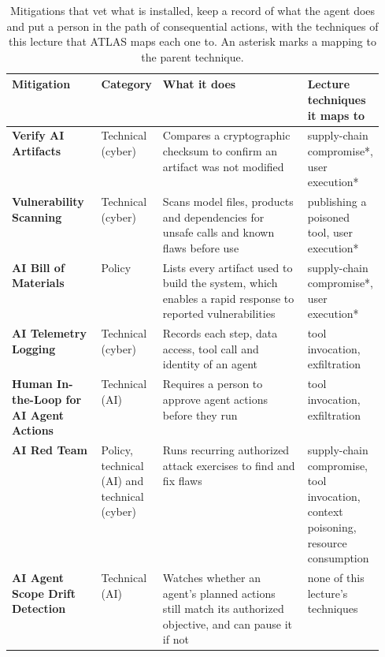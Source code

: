 \begin{table}[tb]
  \caption{Mitigations that vet what is installed, keep a record of what the agent does and put a
  person in the path of consequential actions, with the techniques of this lecture that ATLAS maps
  each one to. An asterisk marks a mapping to the parent technique.}
  \label{tab:mitigations-oversight}
  \begin{adjustbox}{width=\linewidth}\begin{tabularx}{\linewidth}{L{0.24\linewidth}L{0.11\linewidth}XL{0.2\linewidth}}
    \toprule
    \textbf{Mitigation} & \textbf{Category} & \textbf{What it does} & \textbf{Lecture techniques it maps to} \\
    \midrule
    \textbf{Verify AI Artifacts} & Technical (cyber) & Compares a cryptographic checksum to confirm
    an artifact was not modified & supply-chain compromise*, user execution* \\
    \textbf{Vulnerability Scanning} & Technical (cyber) & Scans model files, products and
    dependencies for unsafe calls and known flaws before use & publishing a poisoned tool, user
    execution* \\
    \textbf{AI Bill of Materials} & Policy & Lists every artifact used to build the system, which
    enables a rapid response to reported vulnerabilities & supply-chain compromise*, user
    execution* \\
    \textbf{AI Telemetry Logging} & Technical (cyber) & Records each step, data access, tool call
    and identity of an agent & tool invocation, exfiltration \\
    \textbf{Human In-the-Loop for AI Agent Actions} & Technical (AI) & Requires a person to approve
    agent actions before they run & tool invocation, exfiltration \\
    \textbf{AI Red Team} & Policy, technical (AI) and technical (cyber) & Runs recurring authorized
    attack exercises to find and fix flaws & supply-chain compromise, tool invocation, context
    poisoning, resource consumption \\
    \textbf{AI Agent Scope Drift Detection} & Technical (AI) & Watches whether an agent's planned
    actions still match its authorized objective, and can pause it if not & none of this lecture's
    techniques \\
    \bottomrule
  \end{tabularx}\end{adjustbox}
\end{table}


